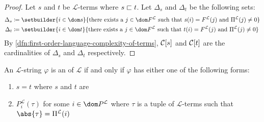\begin{proof}
    Let \( s \) and \( t \) be \( \mathcal{L} \)-terms where \( s  \sqsubset  t \).
    Let \( \Delta_{s} \) and \( \Delta_{t} \) be the following sets:
    \begin{align*}
        \Delta_{s} &\coloneq \setbuilder{i \in \dom s}{\text{there exists a \( j \in \dom F^{\mathcal{L}} \) such that \( s(i) = F^{\mathcal{L}}(j) \) and \( \Pi^{\mathcal{L}}(j) \neq 0 \)}}\\
        \Delta_{t} &\coloneq \setbuilder{i \in \dom t}{\text{there exists a \( j \in \dom F^{\mathcal{L}} \) such that \( t(i) = F^{\mathcal{L}}(j) \) and \( \Pi^{\mathcal{L}}(j) \neq 0 \)}}
    \end{align*}
    By \cref{dfn:first-order-language-complexity-of-terms}, \( \folcomplexityofterm{s} \) and \( \folcomplexityofterm{t} \) are the cardinalities of
    \( \Delta_{s} \) and \( \Delta_{t} \) respectively.
\end{proof}

\begin{dfn}[Atoms]
     \label{dfn:first-order-language-atom}
    An \( \mathcal{L} \)-string \( \varphi \) is an  of \( \mathcal{L} \) if and only if
    \( \varphi \) has either one of the following forms:
    \begin{enumerate}[topsep=2pt,label=\textup{\texttt{(\alph*)}}]
        \item \( s = t \) where \( s \) and \( t \) are 
        \item \( P^{\mathcal{L}}_{i}(\tau) \) for some \( i \in \dom P^{\mathcal{L}} \) where
            \( \tau \) is a tuple of \( \mathcal{L} \)-terms such that \( \abs{\tau} = \Pi^{\mathcal{L}}(i) \)
    \end{enumerate}
\end{dfn}

